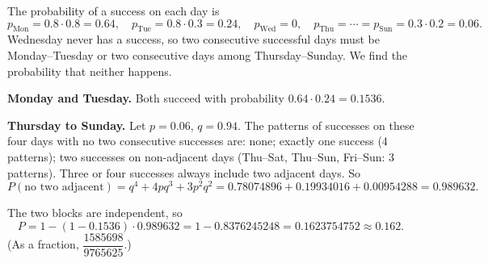 The probability of a success on each day is
\[p_{\mathrm{Mon}}=0.8\cdot0.8=0.64,\quad p_{\mathrm{Tue}}=0.8\cdot0.3=0.24,\quad p_{\mathrm{Wed}}=0,\quad p_{\mathrm{Thu}}=\cdots=p_{\mathrm{Sun}}=0.3\cdot0.2=0.06.\]
Wednesday never has a success, so two consecutive successful days must be Monday--Tuesday or two consecutive days among Thursday--Sunday. We find the probability that neither happens.

\textbf{Monday and Tuesday.} Both succeed with probability $0.64\cdot0.24=0.1536$.

\textbf{Thursday to Sunday.} Let $p=0.06$, $q=0.94$. The patterns of successes on these four days with no two consecutive successes are: none; exactly one success ($4$ patterns); two successes on non-adjacent days (Thu--Sat, Thu--Sun, Fri--Sun: $3$ patterns). Three or four successes always include two adjacent days. So
\[P(\text{no two adjacent})=q^4+4pq^3+3p^2q^2=0.78074896+0.19934016+0.00954288=0.989632.\]

The two blocks are independent, so
\[P=1-(1-0.1536)\cdot0.989632=1-0.8376245248=\boxed{0.1623754752}\approx0.162.\]
(As a fraction, $\dfrac{1585698}{9765625}$.)
